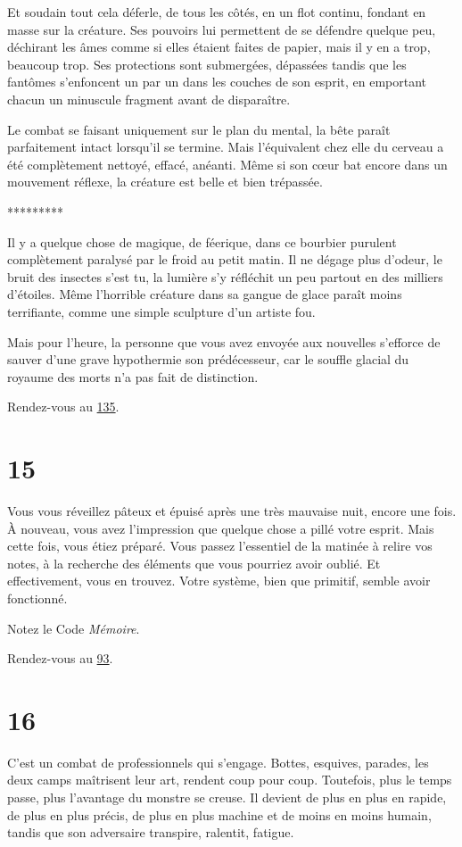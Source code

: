\documentclass{report}
\newcommand{\gsection}[1]{
    \section{#1}
    \label{section-#1}
}
\newcommand{\glink}[1]{\hyperref[section-#1]{#1}}
\newcommand{\ellipse}{
    \begin{center}
        *********
    \end{center}
}
\begin{document}
Et soudain tout cela déferle, de tous les côtés, en un flot continu, fondant en masse sur la créature. Ses pouvoirs lui permettent de se défendre quelque peu, déchirant les âmes comme si elles étaient faites de papier, mais il y en a trop, beaucoup trop. Ses protections sont submergées, dépassées tandis que les fantômes s'enfoncent un par un dans les couches de son esprit, en emportant chacun un minuscule fragment avant de disparaître.

Le combat se faisant uniquement sur le plan du mental, la bête paraît parfaitement intact lorsqu'il se termine. Mais l'équivalent chez elle du cerveau a été complètement nettoyé, effacé, anéanti. Même si son cœur bat encore dans un mouvement réflexe, la créature est belle et bien trépassée.

\ellipse

Il y a quelque chose de magique, de féerique, dans ce bourbier purulent complètement paralysé par le froid au petit matin. Il ne dégage plus d'odeur, le bruit des insectes s'est tu, la lumière s'y réfléchit un peu partout en des milliers d'étoiles. Même l’horrible créature dans sa gangue de glace paraît moins terrifiante, comme une simple sculpture d'un artiste fou.

Mais pour l'heure, la personne que vous avez envoyée aux nouvelles s'efforce de sauver d'une grave hypothermie son prédécesseur, car le souffle glacial du royaume des morts n'a pas fait de distinction.

Rendez-vous au \glink{135}.

\gsection{15}

Vous vous réveillez pâteux et épuisé après une très mauvaise nuit, encore une fois. À nouveau, vous avez l'impression que quelque chose a pillé votre esprit. Mais cette fois, vous étiez préparé. Vous passez l'essentiel de la matinée à relire vos notes, à la recherche des éléments que vous pourriez avoir oublié. Et effectivement, vous en trouvez. Votre système, bien que primitif, semble avoir fonctionné.

Notez le Code \emph{Mémoire}.

Rendez-vous au \glink{93}.

\gsection{16}

C'est un combat de professionnels qui s'engage. Bottes, esquives, parades, les deux camps maîtrisent leur art, rendent coup pour coup. Toutefois, plus le temps passe, plus l'avantage du monstre se creuse. Il devient de plus en plus en rapide, de plus en plus précis, de plus en plus machine et de moins en moins humain, tandis que son adversaire transpire, ralentit, fatigue.
\end{document}
